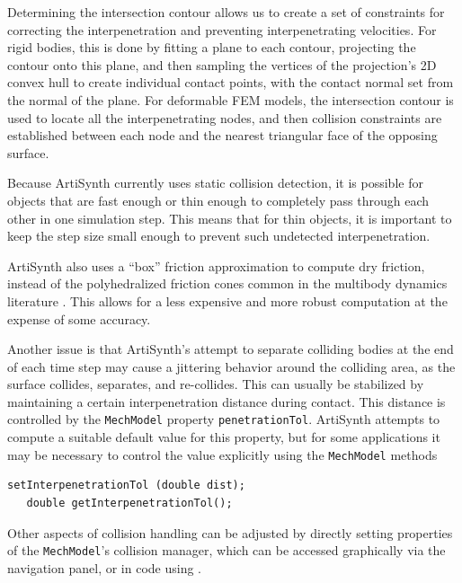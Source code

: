 
Determining the intersection contour allows us to create a set of
constraints for correcting the interpenetration and preventing
interpenetrating velocities.  For rigid bodies, this is done by
fitting a plane to each contour, projecting the contour onto this
plane, and then sampling the vertices of the projection's 2D convex
hull to create individual contact points, with the contact normal set
from the normal of the plane. For deformable FEM models, the
intersection contour is used to locate all the interpenetrating nodes,
and then collision constraints are established between each node and
the nearest triangular face of the opposing surface.

Because ArtiSynth currently uses static collision detection, it is
possible for objects that are fast enough or thin enough to completely
pass through each other in one simulation step. This means that for
thin objects, it is important to keep the step size small enough to
prevent such undetected interpenetration.

ArtiSynth also uses a ``box'' friction approximation
\cite{Lacoursiere07} to compute dry friction, instead of the
polyhedralized friction cones common in the multibody dynamics
literature \cite{AnitescuPotra2002,PotraEtAlTrapezoidal2006}.  This
allows for a less expensive and more robust computation at the expense
of some accuracy.

Another issue is that ArtiSynth's attempt to separate colliding bodies
at the end of each time step may cause a jittering behavior around the
colliding area, as the surface collides, separates, and re-collides.
This can usually be stabilized by maintaining a certain
interpenetration distance during contact. This distance is controlled
by the {\tt MechModel} property {\tt penetrationTol}.  ArtiSynth
attempts to compute a suitable default value for this property, but
for some applications it may be necessary to control the value
explicitly using the {\tt MechModel} methods
%
\begin{lstlisting}[]
   setInterpenetrationTol (double dist);
   double getInterpenetrationTol();
\end{lstlisting}
%

Other aspects of collision handling can be adjusted by directly
setting properties of the {\tt MechModel}'s collision manager, which
can be accessed graphically via the navigation panel, or in code using
.

